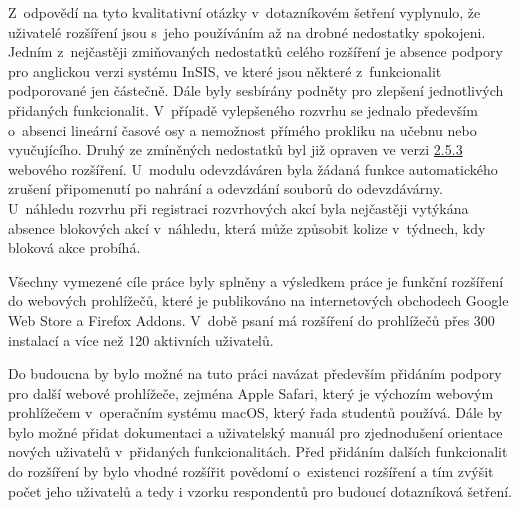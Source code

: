 Z~odpovědí na tyto kvalitativní otázky v~dotazníkovém šetření vyplynulo, že uživatelé rozšíření jsou s~jeho používáním až na drobné nedostatky spokojeni. Jedním z~nejčastěji zmiňovaných nedostatků celého rozšíření je absence podpory pro anglickou verzi systému InSIS, ve které jsou některé z~funkcionalit podporované jen částečně. Dále byly sesbírány podněty pro zlepšení jednotlivých přidaných funkcionalit. V~případě vylepšeného rozvrhu se jednalo především o~absenci lineární časové osy a nemožnost přímého prokliku na učebnu nebo vyučujícího. Druhý ze zmíněných nedostatků byl již opraven ve verzi \href{https://gitlab.com/vse-plus/extension/-/releases/v2.5.3}{2.5.3} webového rozšíření. U~modulu odevzdáváren byla žádaná funkce automatického zrušení připomenutí po nahrání a odevzdání souborů do odevzdávárny. U~náhledu rozvrhu při registraci rozvrhových akcí byla nejčastěji vytýkána absence blokových akcí v~náhledu, která může způsobit kolize v~týdnech, kdy bloková akce probíhá.

Všechny vymezené cíle práce byly splněny a výsledkem práce je funkční rozšíření do webových prohlížečů, které je publikováno na internetových obchodech Google Web Store a Firefox Addons. V~době psaní má rozšíření do prohlížečů přes 300 instalací a více než 120 aktivních uživatelů. 

\clearpage
Do budoucna by bylo možné na tuto práci navázat především přidáním podpory pro další webové prohlížeče, zejména Apple Safari, který je výchozím webovým prohlížečem v~operačním systému macOS, který řada studentů používá. Dále by bylo možné přidat dokumentaci a uživatelský manuál pro zjednodušení orientace nových uživatelů v~přidaných funkcionalitách. Před přidáním dalších funkcionalit do rozšíření by bylo vhodné rozšířit povědomí o~existenci rozšíření a tím zvýšit počet jeho uživatelů a tedy i vzorku respondentů pro budoucí dotazníková šetření. 
